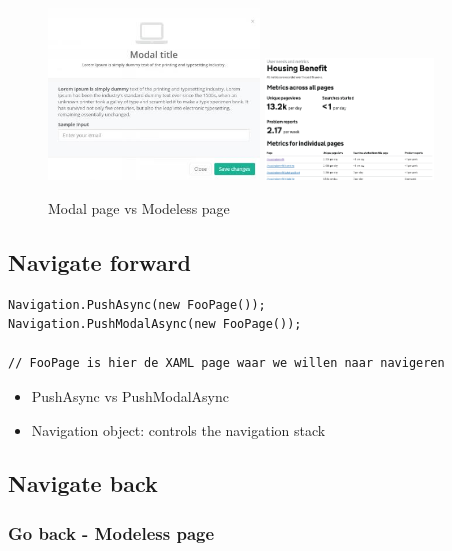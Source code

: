 \documentclass{article}
\begin{document}
\begin{figure}[H]
    \centering
    \includegraphics[width=0.5\textwidth]{modal-page.png}
    \includegraphics[width=0.4\textwidth]{modeless-page.png}
    \caption{Modal page vs Modeless page}
\end{figure}

\subsection{Navigate forward}

\begin{verbatim}
Navigation.PushAsync(new FooPage());
Navigation.PushModalAsync(new FooPage());

// FooPage is hier de XAML page waar we willen naar navigeren
\end{verbatim}

\begin{itemize}
    \item PushAsync vs PushModalAsync
    \item Navigation object: controls the navigation stack
\end{itemize}

\subsection{Navigate back}

\subsubsection{Go back - Modeless page}
\end{document}
